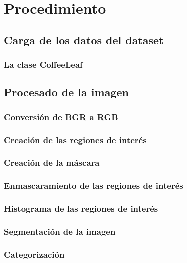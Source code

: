 \chapter{Procedimiento}

\section{Carga de los datos del dataset}

\subsection{La clase CoffeeLeaf}

\section{Procesado de la imagen}

\subsection{Conversión de BGR a RGB}

\subsection{Creación de las regiones de interés}

\subsection{Creación de la máscara}

\subsection{Enmascaramiento de las regiones de interés}

\subsection{Histograma de las regiones de interés}

\subsection{Segmentación de la imagen}

\subsection{Categorización}

